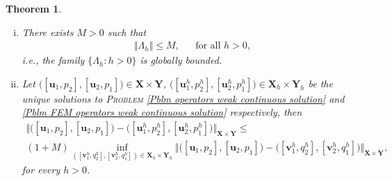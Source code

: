 \documentclass[3p]{elsarticle}
\newtheorem{theorem}{Theorem}
\def\X{\mathbf X}
\def\Y{\mathbf Y}
\def\uone{\mathbf{u}_{1}}
\def\uoneh{\mathbf{u}_{1}^{h}}
\def\utwo{\mathbf{u}_{2}}
\def\utwoh{\mathbf{u}_{2}^{h}}
\def\voneh{\mathbf{v}_{1}^{h}}
\def\vtwoh{\mathbf{v}_{2}^{h}}
\def\qoneh{q_{1}^{h}}
\def\qtwoh{q_{2}^{h}}
\def\pone{p_{1}}
\def\poneh{p_{1}^{h}}
\def\ptwo{p_{2}}
\def\ptwoh{p_{2}^{h}}
\begin{document}
\begin{theorem}\label{Th Bounded by the Infimum}
\begin{enumerate}[(i)]
\item There exists $ M > 0 $ such that 
%
\begin{align}\label{Stmt Projections Uniform Boundedness}
& \Vert \Lambda_{h} \Vert \leq M , &
& \text{for all } h > 0 ,
\end{align}
%
 i.e., the family  $ \big\{ \Lambda_{h}: h > 0 \big\} $ is globally bounded.

\item Let $ \big( [\uone, \ptwo], [\utwo, \pone]\big) \in \X\times \Y $, $ \big( [\uoneh, \ptwoh], [\utwoh, \poneh]\big) \in \X_{h}\times \Y_{h} $ be the unique solutions to \textsc{Problem} \eqref{Pblm operators weak continuous solution} and \eqref{Pblm FEM operators weak continuous solution} respectively, then
%
\begin{multline}\label{Ineq Discrete Solution as Infimum}
\big\Vert \big( [\uone, \ptwo], [\utwo, \pone]\big) 
- \big( [\uoneh, \ptwoh], [\utwoh, \poneh]\big)\big\Vert_{\X\times \Y} \leq 
\\
(1 + M ) \inf\limits_{ ( [\voneh, \qtwoh], [\vtwoh, \qoneh] )\in \X_{h} \times \Y_{h}}
\big\Vert 
\big( [\uone, \ptwo], [\utwo, \pone]\big)
- \big( [\voneh, \qtwoh], [\vtwoh, \qoneh]\big)
\big\Vert_{\X\times \Y} ,
\end{multline}
%
for every $ h >0 $.
\end{enumerate}
%
\end{theorem}
%
\end{document}
